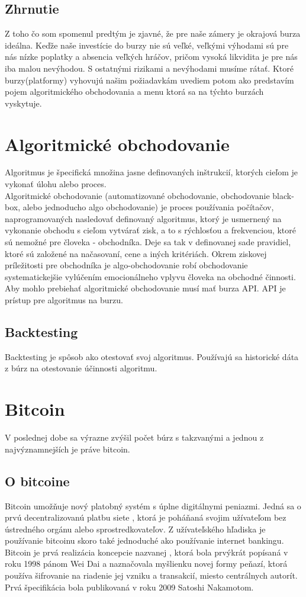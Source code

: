 \subsection{Zhrnutie} 
Z toho čo som spomenul predtým je zjavné,  že pre naše zámery je okrajová burza ideálna. Keďže naše investície do burzy nie sú veľké, veľkými výhodami sú pre nás nízke poplatky a absencia veľkých hráčov, pričom vysoká likvidita je pre nás iba malou nevýhodou. S ostatnými rizikami a nevýhodami musíme rátať. Ktoré burzy(platformy) vyhovujú našim požiadavkám uvediem potom ako predstavím pojem algoritmického obchodovania a menu ktorá sa na týchto burzách vyskytuje. 
\section{Algoritmické obchodovanie} 
Algoritmus je špecifická množina jasne definovaných inštrukcií, ktorých cieľom je vykonať úlohu alebo proces. \\ 
Algoritmické obchodovanie (automatizované obchodovanie, obchodovanie black-box, alebo jednoducho algo obchodovanie) je proces používania počítačov, naprogramovaných nasledovať definovaný algoritmus, ktorý je usmernený na vykonanie obchodu s cieľom vytvárať zisk, a to s  rýchlosťou a frekvenciou, ktoré sú nemožné pre človeka - obchodníka. Deje sa tak v definovanej sade pravidiel, ktoré sú založené na načasovaní, cene a iných kritériách. Okrem ziskovej príležitosti pre obchodníka je algo-obchodovanie %
robí obchodovanie systematickejšie vylúčením emocionálneho vplyvu človeka na obchodné činnosti.\cite{Ba} \\ 
Aby mohlo prebiehať algoritmické obchodovanie musí mať burza API. API je prístup pre algoritmus na burzu. 
\subsection{Backtesting} 
Backtesting je spôsob ako otestovať svoj algoritmus. Používajú sa historické dáta z búrz na otestovanie účinnosti algoritmu. 
\section{Bitcoin} 
V poslednej dobe sa výrazne zvýšil počet búrz s takzvanými  a jednou z najvýznamnejších je práve bitcoin. 
\subsection{O bitcoine} 
Bitcoin umožňuje nový platobný systém s úplne digitálnymi peniazmi. Jedná sa o prvú decentralizovanú platbu siete , ktorá je poháňaná svojim užívateľom bez ústredného orgánu alebo sprostredkovateľov. Z užívateľského hľadiska je používanie bitcoinu skoro také jednoduché ako používanie internet bankingu. Bitcoin je prvá realizácia koncepcie nazvanej , ktorá bola prvýkrát popísaná v roku 1998 pánom Wei Dai a naznačovala myšlienku novej formy peňazí, ktorá používa šifrovanie na riadenie jej vzniku a transakcií, miesto centrálnych autorít.  Prvá špecifikácia bola publikovaná v roku 2009  Satoshi Nakamotom. 
